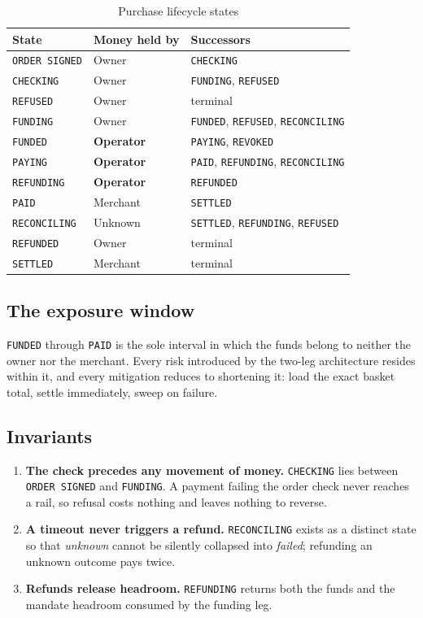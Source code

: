 \documentclass[journal,onecolumn,11pt]{IEEEtran}
\begin{document}
\begin{table}[t]
\centering
\caption{Purchase lifecycle states}
\label{tab:life}
\begin{tabular}{@{}lll@{}}
\toprule
\textbf{State} & \textbf{Money held by} & \textbf{Successors} \\
\midrule
\texttt{ORDER SIGNED} & Owner    & \texttt{CHECKING} \\
\texttt{CHECKING}     & Owner    & \texttt{FUNDING}, \texttt{REFUSED} \\
\texttt{REFUSED}      & Owner    & terminal \\
\texttt{FUNDING}      & Owner    & \texttt{FUNDED}, \texttt{REFUSED}, \texttt{RECONCILING} \\
\texttt{FUNDED}       & \textbf{Operator} & \texttt{PAYING}, \texttt{REVOKED} \\
\texttt{PAYING}       & \textbf{Operator} & \texttt{PAID}, \texttt{REFUNDING}, \texttt{RECONCILING} \\
\texttt{REFUNDING}    & \textbf{Operator} & \texttt{REFUNDED} \\
\texttt{PAID}         & Merchant & \texttt{SETTLED} \\
\texttt{RECONCILING}  & Unknown  & \texttt{SETTLED}, \texttt{REFUNDING}, \texttt{REFUSED} \\
\texttt{REFUNDED}     & Owner    & terminal \\
\texttt{SETTLED}      & Merchant & terminal \\
\bottomrule
\end{tabular}
\end{table}

\subsection{The exposure window}
\texttt{FUNDED} through \texttt{PAID} is the sole interval in which the funds belong to
neither the owner nor the merchant. Every risk introduced by the two-leg architecture
resides within it, and every mitigation reduces to shortening it: load the exact basket
total, settle immediately, sweep on failure.

\subsection{Invariants}
\begin{enumerate}[leftmargin=*]
\item \textbf{The check precedes any movement of money.} \texttt{CHECKING} lies between
\texttt{ORDER SIGNED} and \texttt{FUNDING}. A payment failing the order check never
reaches a rail, so refusal costs nothing and leaves nothing to reverse.
\item \textbf{A timeout never triggers a refund.} \texttt{RECONCILING} exists as a
distinct state so that \emph{unknown} cannot be silently collapsed into \emph{failed};
refunding an unknown outcome pays twice.
\item \textbf{Refunds release headroom.} \texttt{REFUNDING} returns both the funds and
the mandate headroom consumed by the funding leg.
\end{enumerate}
\end{document}
